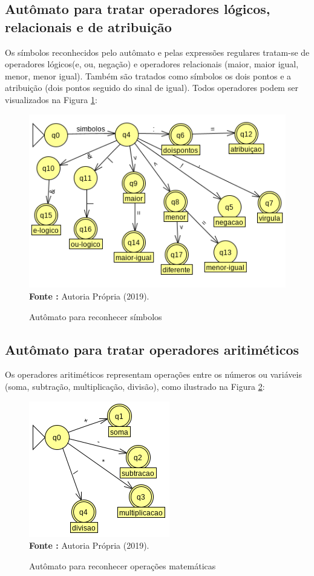 \documentclass[12pt]{article}
\begin{document}
\subsection{Autômato para tratar operadores lógicos, relacionais e de atribuição}  
Os símbolos reconhecidos pelo autômato e pelas expressões regulares tratam-se de operadores lógicos(e, ou, negação) e operadores relacionais (maior, maior igual, menor, menor igual). Também são tratados como símbolos os dois pontos e a atribuição (dois pontos seguido do sinal de igual). Todos operadores podem ser visualizados na Figura \ref{fig:ssim}:
\begin{figure}[H]  
	\caption{Autômato para reconhecer símbolos}
	\includegraphics[scale=0.8]{simbolos}\\ 
	\textbf{Fonte :} Autoria Própria (2019). 	 
	\label{fig:ssim}
\end{figure}  

\subsection{Autômato para tratar operadores aritiméticos}  
Os operadores aritiméticos representam operações entre os números ou variáveis (soma, subtração, multiplicação, divisão), como ilustrado na Figura \ref{fig:ff}:
\begin{figure}[H]   
	\centering
	\caption{Autômato para reconhecer operações matemáticas}
	\includegraphics[scale=0.8]{operacoes}\\ 
	\textbf{Fonte :} Autoria Própria (2019). 	 
	\label{fig:ff}
\end{figure}    
\end{document}
